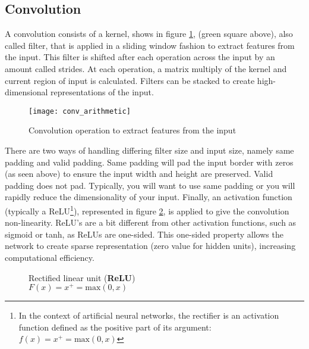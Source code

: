 \subsection{Convolution}
\label{ssec:convolution}
%
A convolution consists of a kernel, shows in figure \ref{fig:convolution}, 
(green square above), also called filter,
that is applied in a sliding window fashion to extract features from the input.
This filter is shifted after each operation across the input by an amount called
strides. At each operation, a matrix multiply of the kernel and current region
of input is calculated. Filters can be stacked to create high-dimensional
representations of the input.
%
\begin{figure}[!h]
\centering
\texttt{[image: conv\_arithmetic]}
\caption{Convolution operation to extract features from the input}
\label{fig:convolution}
\end{figure}
%
There are two ways of handling differing filter size and input size, namely
same padding and valid padding.
Same padding will pad the input border with zeros (as seen above) to ensure the
input width and height are preserved. Valid padding does not pad.
Typically, you will want to use same padding or you will rapidly reduce the
dimensionality of your input.
Finally, an activation function (typically a ReLU\footnote{In the context of 
artificial neural networks, the rectifier is an activation function defined as 
the positive part of its argument:\\ \(f(x) = x^{+} = \text{max}(0,x)\)}), 
represented in figure \ref{fig:relu}, is applied to give the convolution non-linearity.
ReLU’s are a bit different from other activation functions, such as sigmoid or
tanh, as ReLUs are one-sided.
This one-sided property allows the network to create sparse representation
(zero value for hidden units), increasing computational efficiency.
%
\begin{figure}[htb]
\centering
{}
\caption{Rectified linear unit (\textbf{ReLU})\\ \(F(x) = x^{+} = \text{max}(0,x)\)}
\label{fig:relu}
\end{figure}
%
